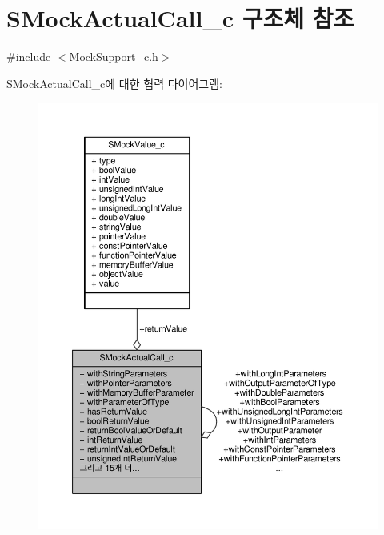 \hypertarget{struct_s_mock_actual_call__c}{}\section{S\+Mock\+Actual\+Call\+\_\+c 구조체 참조}
\label{struct_s_mock_actual_call__c}


{\ttfamily \#include $<$Mock\+Support\+\_\+c.\+h$>$}



S\+Mock\+Actual\+Call\+\_\+c에 대한 협력 다이어그램\+:
\nopagebreak
\begin{figure}[H]
\begin{center}
\leavevmode
\includegraphics[width=350pt]{struct_s_mock_actual_call__c__coll__graph}
\end{center}
\end{figure}
